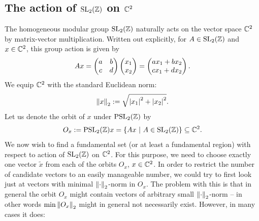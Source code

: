 \subsection{The action of $\operatorname{SL}_{2}(\mathbb{Z})$ on $\mathbb{C}^2$}

The homogeneous modular group $\operatorname{SL}_{2}(\mathbb{Z})$ naturally acts on the vector space $\mathbb{C}^2$ by matrix-vector multiplication. Written out explicitly, for $A \in \operatorname{SL}_{2}(\mathbb{Z})$ and $x \in \mathbb{C}^2$, this group action is given by
\begin{equation*}
A x = \begin{pmatrix}a & b \\ c & d\end{pmatrix} \begin{pmatrix}x_1 \\ x_2\end{pmatrix} = \begin{pmatrix}a x_1 + b x_2 \\ c x_1 + d x_2\end{pmatrix}.
\end{equation*}
We equip $\mathbb{C}^2$ with the standard Euclidean norm: 
\begin{equation*}
\left\| x \right\|_2 := \sqrt{\left|x_1\right|^2 + \left|x_2\right|^2}.
\end{equation*}
Let us denote the orbit of $x$ under $\operatorname{PSL}_{2}(\mathbb{Z})$ by 
\begin{equation}
O_x := \operatorname{PSL}_{2}(\mathbb{Z}) x = \{ Ax \ | \ A \in \operatorname{SL}_{2}(\mathbb{Z}) \} \subseteq \mathbb{C}^2.
\end{equation}
We now wish to find a fundamental set (or at least a fundamental region) with respect to action of $\operatorname{SL}_{2}(\mathbb{Z})$ on $\mathbb{C}^2$. For this purpose, we need to choose exactly one vector $\tilde{x}$ from each of the orbits $O_x$, $x \in \mathbb{C}^2$. In order to restrict the number of candidate vectors to an easily manageable number, we could try to first look just at vectors with minimal $\left\| \cdot \right\|_2$-norm in $O_x$. The problem with this is that in general the orbit $O_x$ might contain vectors of arbitrary small $\left\| \cdot \right\|_2$-norm -- in other words $\min{\left\| O_x \right\|_2}$ might in general not necessarily exist. However, in many cases it does:

